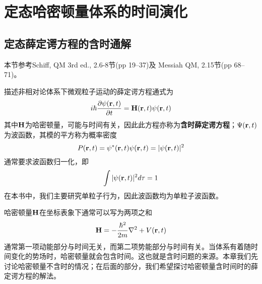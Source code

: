 
\chapter{定态哈密顿量体系的时间演化}
\label{cpt:1}
\section{定态薛定谔方程的含时通解}
\begin{framed}
本节参考Schiff, QM 3rd ed., 2.6-8节(pp 19--37)及 Messiah QM, 2.15节(pp 68--71)。
\end{framed}

描述非相对论体系下微观粒子运动的薛定谔方程通式为
\begin{equation}\label{eqn:tdsefull}
i\hbar \dfrac{\partial \psi(\bm{\mathrm{r}},t)}{\partial t}=\bm{\mathrm{H}}(\bm{\mathrm{r}},t) \psi(\bm{\mathrm{r}},t)
\end{equation}
其中$ \bm{\mathrm{H}} $为哈密顿量，可能与时间有关，因此此方程亦称为\textbf{含时薛定谔方程}；$ \Psi(\bm{\mathrm{r}},t) $为波函数，其模的平方称为概率密度
\begin{equation}\label{key}
P(\bm{\mathrm{r}},t)=\psi^*(\bm{\mathrm{r}},t)\psi(\bm{\mathrm{r}},t)=|\psi(\bm{\mathrm{r}},t)|^2
\end{equation}
通常要求波函数归一化，即
\begin{equation}\label{key}
\int |\psi(\bm{\mathrm{r}},t)|^2d\tau=1
\end{equation}
在本书中，我们主要研究单粒子行为，因此波函数均为单粒子波函数。

哈密顿量$ \bm{\mathrm{H}} $在坐标表象下通常可以写为两项之和
\begin{equation}\label{key}
\bm{\mathrm{H}}=-\dfrac{\hbar^2}{2m}\nabla^2+V(\bm{\mathrm{r}},t)
\end{equation}
通常第一项动能部分与时间无关，而第二项势能部分与时间有关。当体系有着随时间变化的势场时，哈密顿量就会包含时间。这也就是含时问题的来源。本章我们先讨论哈密顿量不含时的情况；在后面的部分，我们希望探讨哈密顿量含时间时的薛定谔方程的解法。

